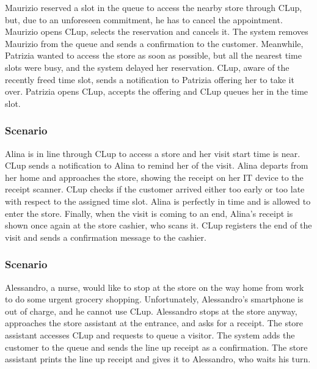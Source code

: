 \documentclass[../../main.tex]{subfiles}
\begin{document}
  Maurizio reserved a slot in the queue to access the nearby store through CLup, but, due to an unforeseen commitment, 
  he has to cancel the appointment. Maurizio opens CLup, selects the reservation and cancels it. 
  The system removes Maurizio from the queue and sends a confirmation to the customer. 
  Meanwhile, Patrizia wanted to access the store as soon as possible, but all the nearest time slots were busy, 
  and the system delayed her reservation. CLup, aware of the recently freed time slot, sends a notification to Patrizia offering her to take it over. 
  Patrizia opens CLup, accepts the offering and CLup queues her in the time slot.


\subsubsection{Scenario }

  Alina is in line through CLup to access a store and her visit start time is near. 
  CLup sends a notification to Alina to remind her of the visit. 
  Alina departs from her home and approaches the store, showing the receipt on her IT device to the receipt scanner. 
  CLup checks if the customer arrived either too early or too late with respect to the assigned time slot. 
  Alina is perfectly in time and is allowed to enter the store. Finally, when the visit is coming to an end, 
  Alina's receipt is shown once again at the store cashier, who scans it. 
  CLup registers the end of the visit and sends a confirmation message to the cashier.


\subsubsection{Scenario }

  Alessandro, a nurse, would like to stop at the store on the way home from work to do some urgent grocery shopping. 
  Unfortunately, Alessandro's smartphone is out of charge, and he cannot use CLup. 
  Alessandro stops at the store anyway, approaches the store assistant at the entrance, and asks for a receipt. 
  The store assistant accesses CLup and requests to queue a visitor. The system adds the customer to the queue and sends the line up receipt as a confirmation. 
  The store assistant prints the line up receipt and gives it to Alessandro, who waits his turn.
\end{document}
